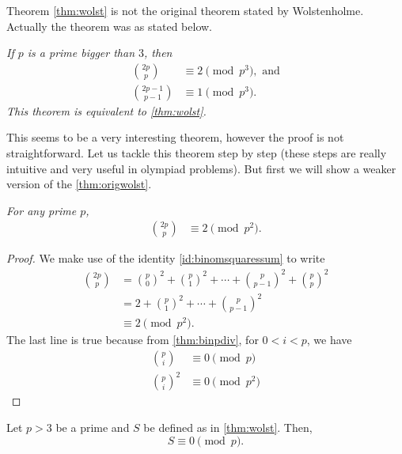 \documentclass[12pt]{subfile}
\begin{document}
		\begin{remark}
			Theorem \eqref{thm:wolst} is not the original theorem stated by Wolstenholme. Actually the theorem was as stated below.
		\end{remark}

		\begin{theorem}\slshape\label{thm:origwolst}
			If $p$ is a prime bigger than $3$, then
			\begin{align*}
				\binom{2p}{p} & \equiv2\pmod{p^3}, \text{ and}\\
				\binom{2p-1}{p-1} & \equiv 1 \pmod{p^3}.
			\end{align*}
			This theorem is equivalent to \autoref{thm:wolst}.
		\end{theorem}
	This seems to be a very interesting theorem, however the proof is not straightforward. Let us tackle this theorem step by step (these steps are really intuitive and very useful in olympiad problems). But first we will show a weaker version of the \autoref{thm:origwolst}.
		\begin{theorem}\slshape
			For any prime $p$,
				\begin{align*}
					\binom{2p}{p} & \equiv2\pmod{p^2}.
				\end{align*}
		\end{theorem}

		\begin{proof}
			We make use of the identity \eqref{id:binomsquaressum} to write
				\begin{align*}
					\binom{2p}p & = \binom{p}0^2+\binom{p}{1}^2+\cdots+\binom{p}{p-1}^2+\binom{p}{p}^2\\
								& = 2+\binom{p}{1}^2+\cdots+\binom{p}{p-1}^2\\
								& \equiv2\pmod{p^2}.
				\end{align*}
			The last line is true because from \autoref{thm:binpdiv}, for $0<i<p$, we have
				\begin{align*}
					\binom{p}{i}
						& \equiv 0\pmod p\\
					\binom{p}{i}^2
						& \equiv 0\pmod{p^2}
				\end{align*}
		\end{proof}

		\begin{lemma}\label{lem:wolstproof1}
			Let $p>3$ be a prime and $S$ be defined as in \autoref{thm:wolst}. Then, $$S \equiv 0 \pmod p.$$
		\end{lemma}
\end{document}
